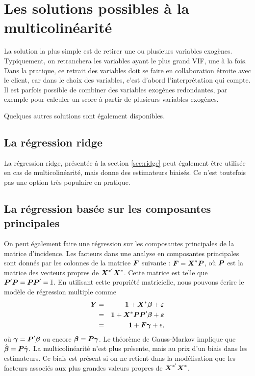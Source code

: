 \section{Les solutions possibles à la multicolinéarité}
\label{sec:solutionsMulticolinearite}

La solution la plus simple est de retirer une ou plusieurs variables exogènes. Typiquement, on retranchera les variables ayant le plus grand VIF, une à la fois. Dans la pratique, ce retrait des variables doit se faire en collaboration étroite avec le client, car dans le choix des variables, c'est d'abord l'interprétation qui compte. Il est parfois possible  de combiner des variables exogènes redondantes, par exemple pour calculer un score à partir de plusieurs variables exogènes.

Quelques autres solutions sont également disponibles.



\subsection{La régression \og ridge \fg}

La régression ridge, présentée à la section \ref{sec:ridge} peut également être utilisée en cas de multicolinéarité, mais donne des estimateurs biaisés. Ce n'est toutefois pas une option très populaire en pratique.


\subsection{La régression basée sur les composantes principales}


On peut également faire une régression sur les composantes principales de la matrice d'incidence. Les facteurs dans une analyse en composantes principales sont donnés par les colonnes de la matrice $\mbox{\boldmath$F$\unboldmath}$ suivante :
$\mbox{\boldmath$F$\unboldmath}=\mbox{\boldmath$X$\unboldmath}^*\mbox{\boldmath$P$\unboldmath}$,
où $\mbox{\boldmath$P$\unboldmath}$ est la matrice des vecteurs propres de $\mbox{\boldmath$X$\unboldmath}^{*'}\mbox{\boldmath$X$\unboldmath}^*$. Cette matrice est telle que $\mbox{\boldmath$P$\unboldmath}'\mbox{\boldmath$P$\unboldmath}=\mbox{\boldmath$P$\unboldmath}\mbox{\boldmath$P$\unboldmath}'=\mbox{\boldmath$\mathbb{I}$\unboldmath}$. En utilisant cette propriété matricielle, nous pouvons écrire le modèle de régression multiple comme
\begin{eqnarray*}
\mbox{\boldmath$Y$\unboldmath} & = & \mbox{\boldmath$1$\unboldmath}+\mbox{\boldmath$X$\unboldmath}^*\mbox{\boldmath$\beta$} + \mbox{\boldmath$\varepsilon$\unboldmath} \\
 & = & \mbox{\boldmath$1$\unboldmath}+\mbox{\boldmath$X$\unboldmath}^*\mbox{\boldmath$P$\unboldmath}\mbox{\boldmath$P$\unboldmath}'\mbox{\boldmath$\beta$}+ \mbox{\boldmath$\varepsilon$\unboldmath}\\
& = & \mbox{\boldmath$1$\unboldmath}+\mbox{\boldmath$F$\unboldmath}\mbox{\boldmath$\gamma$\unboldmath}+\epsilon,
\end{eqnarray*}
où $\mbox{\boldmath$\gamma$\unboldmath}=\mbox{\boldmath$P$\unboldmath}'\mbox{\boldmath$\beta$}$ ou encore $\mbox{\boldmath$\beta$}=\mbox{\boldmath$P$\unboldmath}\mbox{\boldmath$\gamma$\unboldmath}$. Le théorème de Gauss-Markov implique que $\hat{\mbox{\boldmath$\beta$}}=\mbox{\boldmath$P$\unboldmath}\hat{\mbox{\boldmath$\gamma$\unboldmath}}.$
La multicolinéarité n'est plus présente, mais au prix d'un biais dans les estimateurs. Ce biais est présent si on ne retient dans la modélisation que les facteurs associés aux plus grandes valeurs propres de $\mbox{\boldmath$X$\unboldmath}^{*'}\mbox{\boldmath$X$\unboldmath}^*$.

